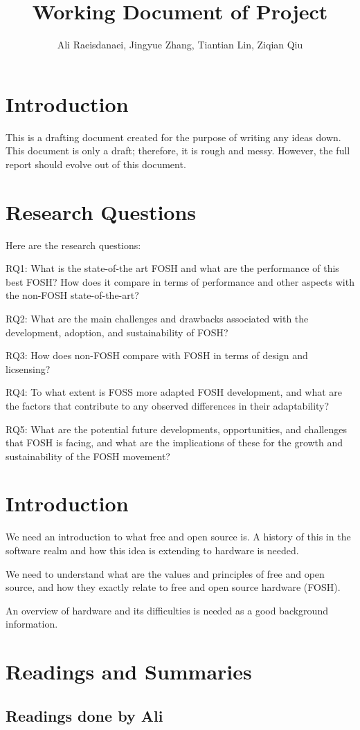 \documentclass{article}
\begin{document}


\title{Working Document of Project}
\author{Ali Raeisdanaei, Jingyue Zhang, Tiantian Lin, Ziqian Qiu }
\date{}
\maketitle

\section{Introduction}
This is a drafting document created for the purpose of writing any ideas down.
This document is only a draft; therefore, it is rough and messy.
However, the full report should evolve out of this document.

\section{Research Questions}
Here are the research questions:

RQ1: What is the state-of-the art FOSH and what are the performance of this best FOSH? How does it compare in terms of performance and other aspects with the non-FOSH state-of-the-art? 

RQ2: What are the main challenges and drawbacks associated with the development, adoption, and sustainability of FOSH?

RQ3: How does non-FOSH compare with FOSH in terms of design and licsensing?

RQ4: To what extent is FOSS more adapted FOSH development, and what are the factors that contribute to any observed differences in their adaptability?

RQ5: What are the potential future developments, opportunities, and challenges that FOSH is facing, and what are the implications of these for the growth and sustainability of the FOSH movement?

\section{Introduction}
We need an introduction to what free and open source is. 
A history of this in the software realm and how this idea is extending to hardware is needed. 

We need to understand what are the values and principles of free and open source, and how they exactly relate to free and open source hardware (FOSH).

An overview of hardware and its difficulties is needed as a good background information. 

\section{Readings and Summaries}

\subsection{Readings done by Ali}

\nocite{*}
\printbibliography
\end{document}
